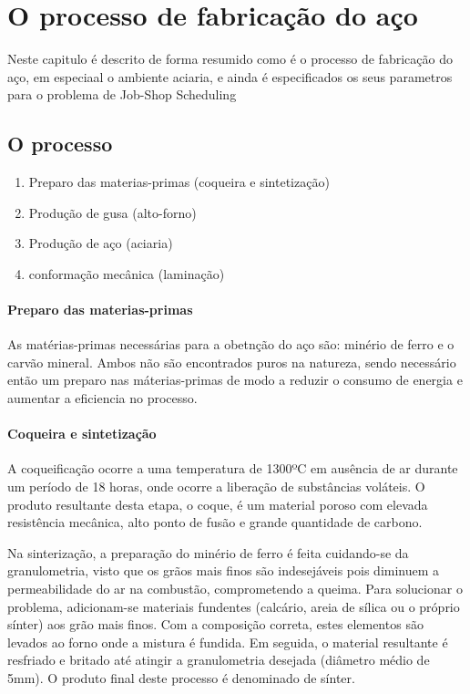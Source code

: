 \chapter{O processo de fabricação do aço}
Neste capitulo é descrito de forma resumido como é o processo de fabricação do aço, em especiaal o ambiente aciaria, e ainda é especificados os seus parametros para o problema de Job-Shop Scheduling
\section{O processo}
\begin {enumerate}
	\item Preparo das materias-primas (coqueira e sintetização)
	\item Produção de gusa (alto-forno)
	\item Produção de aço (aciaria)
	\item conformação mecânica (laminação)
\end{enumerate}

\subsubsection{Preparo das materias-primas}
As matérias-primas necessárias para a obetnção do aço são: minério de ferro e o carvão mineral. Ambos não são encontrados puros na natureza, sendo necessário então um preparo nas máterias-primas de modo a reduzir o consumo de energia e aumentar a eficiencia no processo.

\subsubsection{Coqueira e sintetização}
A coqueificação ocorre a uma temperatura de 1300ºC em ausência de ar durante um período de 18 horas, onde ocorre a liberação de substâncias voláteis. O produto resultante desta etapa, o coque, é um material poroso com elevada resistência mecânica, alto ponto de fusão e grande quantidade de carbono.

Na sinterização, a preparação do minério de ferro é feita cuidando-se da granulometria, visto que os grãos mais finos são indesejáveis pois diminuem a permeabilidade do ar na combustão, comprometendo a queima. Para solucionar o problema, adicionam-se materiais fundentes (calcário, areia de sílica ou o próprio sínter) aos grão mais finos.
Com a composição correta, estes elementos são levados ao forno onde a mistura é fundida. Em seguida, o material resultante é resfriado e britado até atingir a granulometria desejada (diâmetro médio de 5mm).
O produto final deste processo é denominado de sínter.

